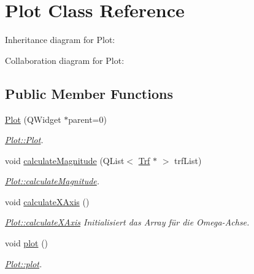 \hypertarget{classPlot}{}\section{Plot Class Reference}
\label{classPlot}


Inheritance diagram for Plot\+:


Collaboration diagram for Plot\+:
\subsection*{Public Member Functions}
\begin{DoxyCompactItemize}
\item 
\hyperlink{classPlot_acb95c0d3a6d1d4edf7b946863efdac98}{Plot} (Q\+Widget $\ast$parent=0)
\begin{DoxyCompactList}\small\item\em \hyperlink{classPlot_acb95c0d3a6d1d4edf7b946863efdac98}{Plot\+::\+Plot}. \end{DoxyCompactList}\item 
void \hyperlink{classPlot_a1c6fda8fe644da0e0f0df6bf659455de}{calculate\+Magnitude} (Q\+List$<$ \hyperlink{classTrf}{Trf} $\ast$ $>$ trf\+List)
\begin{DoxyCompactList}\small\item\em \hyperlink{classPlot_a1c6fda8fe644da0e0f0df6bf659455de}{Plot\+::calculate\+Magnitude}. \end{DoxyCompactList}\item 
\hypertarget{classPlot_a0a85fd66f164e906708074112bd2d997}{}void \hyperlink{classPlot_a0a85fd66f164e906708074112bd2d997}{calculate\+X\+Axis} ()\label{classPlot_a0a85fd66f164e906708074112bd2d997}

\begin{DoxyCompactList}\small\item\em \hyperlink{classPlot_a0a85fd66f164e906708074112bd2d997}{Plot\+::calculate\+X\+Axis} Initialisiert das Array für die Omega-\/\+Achse. \end{DoxyCompactList}\item 
void \hyperlink{classPlot_a8fae6078f872f751aa80d1f037266438}{plot} ()
\begin{DoxyCompactList}\small\item\em \hyperlink{classPlot_a8fae6078f872f751aa80d1f037266438}{Plot\+::plot}. \end{DoxyCompactList}\end{DoxyCompactItemize}
